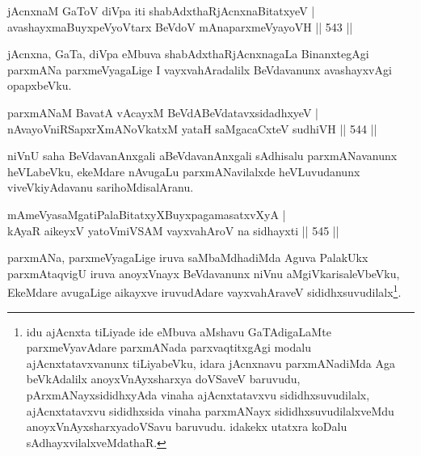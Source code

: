
\begin{shl}
jAcnxnaM GaToV diVpa iti shabAdxthaRjAcnxnaBitatxyeV | \\
avashayxmaBuyxpeVyoV\s tarx BeVdoV mAnaparxmeVyayoVH \hfill||  543 ||  
\end{shl}

\begin{artha}
jAcnxna, GaTa, diVpa eMbuva shabAdxthaRjAcnxnagaLa BinanxtegAgi parxmANa parxmeVyagaLige I vayxvahAradalilx BeVdavanunx avashayxvAgi opapxbeVku.
\end{artha}

\begin{shl}
parxmANaM BavatA vAcayxM \footnotemark[1]BeVdABeVdatavxsidadhxyeV | \\
nA\s \s vayoVniRSapxrXmANoVkatxM yataH saMgacaCxteV sudhiVH \hfill||  544 ||  
\end{shl}

\begin{artha}
niVnU saha BeVdavanAnxgali aBeVdavanAnxgali sAdhisalu parxmANavanunx heVLabeVku, ekeMdare nAvugaLu parxmANavilalxde heVLuvudanunx viveVkiyAdavanu sarihoMdisalAranu.
\end{artha}


\begin{shl}
mAmeVyasaMgatiPalaBitatxyXBuyxpagamasatxvXyA | \\
kAyaR aikeyxV yatoV\s miVSAM vayxvahAroV na sidhayxti \hfill||  545 ||  
\end{shl}

\begin{artha}
parxmANa, parxmeVyagaLige iruva saMbaMdhadiMda Aguva PalakUkx parxmAtaqvigU iruva anoyxVnayx BeVdavanunx niVnu aMgiVkarisaleVbeVku, EkeMdare avugaLige aikayxve iruvudAdare vayxvahAraveV sididhxsuvudilalx\footnote{idu ajAcnxta tiLiyade ide eMbuva aMshavu GaTAdigaLaMte parxmeVyavAdare parxmANada parxvaqtitxgAgi modalu ajAcnxtatavxvanunx tiLiyabeVku, idara jAcnxnavu parxmANadiMda Aga beVkAdalilx anoyxVnAyxsharxya doVSaveV baruvudu, pArxmANayxsididhxyAda vinaha ajAcnxtatavxvu sididhxsuvudilalx, ajAcnxtatavxvu sididhxsida vinaha parxmANayx sididhxsuvudilalxveMdu anoyxVnAyxsharxyadoVSavu baruvudu. idakekx utatxra koDalu sAdhayxvilalxveMdathaR.}.
\end{artha}

